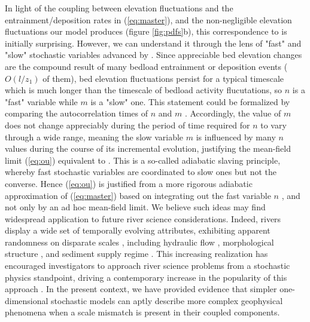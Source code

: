 \documentclass[draft]{agujournal2018}
\begin{document}
In light of the coupling between elevation fluctuations and the entrainment/deposition rates in (\ref{eq:master}), and the non-negligible elevation fluctuations our model produces (figure \ref{fig:pdfs}b), this correspondence to \citet{Martin2014} is initially surprising.
However, we can understand it through the lens of "fast" and "slow" stochastic variables advanced by \citet{Haken1983}.
Since appreciable bed elevation changes are the compound result of many bedload entrainment or deposition events ($O(l/z_1)$ of them), bed elevation fluctuations persist for a typical timescale which is much longer than the timescale of bedload activity flucutations, so $n$ is a "fast" variable while $m$ is a "slow" one.
This statement could be formalized by comparing the autocorrelation times of $n$ and $m$ \citep[e.g.,][]{Gardiner1983}.
Accordingly, the value of $m$ does not change appreciably during the period of time required for $n$ to vary through a wide range, meaning the slow variable $m$ is influenced by many $n$ values during the course of its incremental evolution, justifying the mean-field limit (\ref{eq:ou}) equivalent to \citet{Martin2014}.
This is a so-called adiabatic slaving principle, whereby fast stochastic variables are coordinated to slow ones but not the converse.
Hence (\ref{eq:ou}) is justified from a more rigorous adiabatic approximation of (\ref{eq:master}) based on integrating out the fast variable $n$ \citep[e.g.,][]{Haken1983,Gardiner1983}, and not only by an ad hoc mean-field limit.
We believe such ideas may find widespread application to future river science considerations.
Indeed, rivers display a wide set of temporally evolving attributes, exhibiting apparent randomness on disparate scales \citep{Chartrand2019}, including hydraulic flow \citep[e.g.,][]{Ferrer-Boix2015}, morphological structure \citep[e.g.,][]{Dhont2018}, and sediment supply regime \citep[e.g.,][]{Elgueta-Astaburuaga2019}.
This increasing realization has encouraged investigators to approach river science problems from a stochastic physics standpoint, driving a contemporary increase in the popularity of this approach \citep[e.g][]{Ancey2008,Furbish2012}.
In the present context, we have provided evidence that simpler one-dimensional stochastic models \citep[e.g.,][]{Martin2014} can aptly describe more complex geophysical phenomena when a scale mismatch is present in their coupled components.
\end{document}
